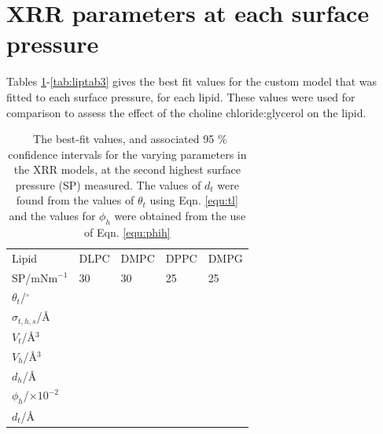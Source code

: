 \documentclass[11pt,a4paper]{paper}
\begin{document}
\section{XRR parameters at each surface pressure}
Tables \ref{tab:liptab1}-\ref{tab:liptab3} gives the best fit values for the custom model that was fitted to each surface pressure, for each lipid. These values were used for comparison to assess the effect of the choline chloride:glycerol on the lipid.
%
\begin{table}
  \centering
	\caption{\ The best-fit values, and associated 95 \% confidence intervals for the varying parameters in the XRR models, at the second highest surface pressure (SP) measured. The values of $d_t$ were found from the values of $\theta_t$ using Eqn. \ref{equ:tl} and the values for $\phi_h$ were obtained from the use of Eqn. \ref{equ:phih}}
	\label{tab:liptab1}
	\begin{tabular}{l|l|l|l|l}
		Lipid & DLPC & DMPC & DPPC & DMPG \\
    SP/mNm$^{-1}$ & 30 & 30 & 25 & 25 \\
		\hline
		$\theta_t$/$^\circ$ &  &  &  &  \\
		$\sigma_{t,h,s}$/\AA &  &  &  &  \\
    \hline
    $V_t$/\AA$^3$ &  &  &  &  \\
		$V_h$/\AA$^3$ &  &  &  &  \\
		$d_h$/\AA &  &  &  &  \\
    \hline
    $\phi_h$/$\times10^{-2}$ &  &  &  &  \\
		$d_t$/\AA &  &  &  &  \\
	\end{tabular}
\end{table}
\end{document}
